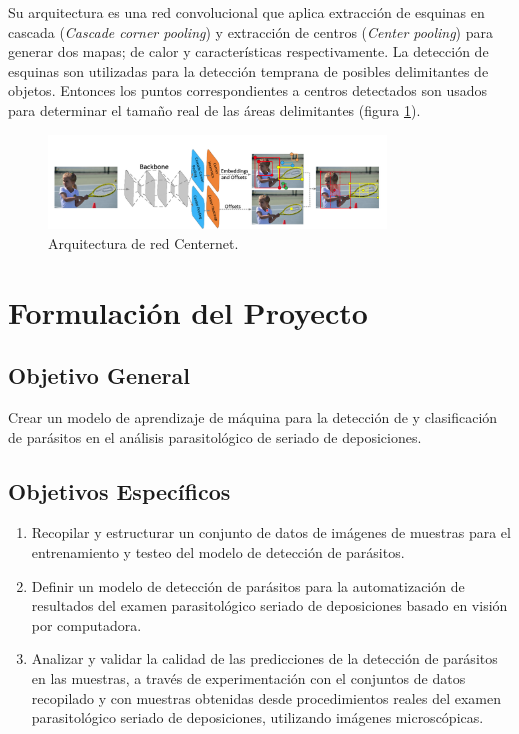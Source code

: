 \documentclass[letter,12pt]{report}
\begin{document}
Su arquitectura es una red convolucional que aplica extracción de esquinas en cascada (\textit{Cascade corner pooling}) y 
extracción de centros (\textit{Center pooling}) para generar dos mapas; de calor y características respectivamente. La detección
de esquinas son utilizadas para la detección temprana de posibles delimitantes de objetos. Entonces los puntos correspondientes a
centros detectados son usados para determinar el tamaño real de las áreas delimitantes (figura \ref{fig:arquitectureCenternet}).

\begin{figure}[ht]
    \centering
    \includegraphics[width=0.8\textwidth]{arquitectureCenternet}
    \caption{Arquitectura de red Centernet.}
    \label{fig:arquitectureCenternet}
\end{figure}


\chapter{Formulación del Proyecto}\label{formulación}

\section{Objetivo General}
Crear un modelo de aprendizaje de máquina para la detección de y clasificación de
parásitos en el análisis parasitológico de seriado de deposiciones.

\section{Objetivos Específicos}
\begin{enumerate}\justifying
    \item Recopilar y estructurar un conjunto de datos de imágenes de muestras para el entrenamiento y testeo del modelo de detección de parásitos.
    \item Definir un modelo de detección de parásitos para la automatización de resultados del examen parasitológico seriado de deposiciones basado en visión por computadora.
    \item Analizar y validar la calidad de las predicciones de la detección de parásitos en
        las muestras, a través de experimentación con el conjuntos de datos recopilado y
        con muestras obtenidas desde procedimientos reales del examen parasitológico
        seriado de deposiciones, utilizando imágenes microscópicas.
\end{enumerate}
\end{document}

